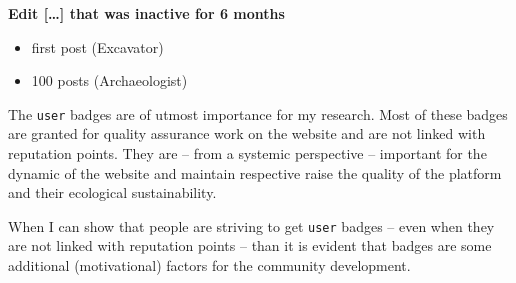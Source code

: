 \documentclass[]{book}
\providecommand{\tightlist}{%
  \setlength{\itemsep}{0pt}\setlength{\parskip}{0pt}}
\theoremstyle{definition}
\theoremstyle{definition}
\theoremstyle{definition}
\theoremstyle{remark}
\begin{document}
\textbf{Edit {[}\ldots{}{]} that was inactive for 6 months}

\begin{itemize}
\tightlist
\item
  first post (Excavator)
\item
  100 posts (Archaeologist)
\end{itemize}

The \texttt{user} badges are of utmost importance for my research. Most
of these badges are granted for quality assurance work on the website
and are not linked with reputation points. They are -- from a systemic
perspective -- important for the dynamic of the website and maintain
respective raise the quality of the platform and their ecological
sustainability.

When I can show that people are striving to get \texttt{user} badges --
even when they are not linked with reputation points -- than it is
evident that badges are some additional (motivational) factors for the
community development.
\end{document}
